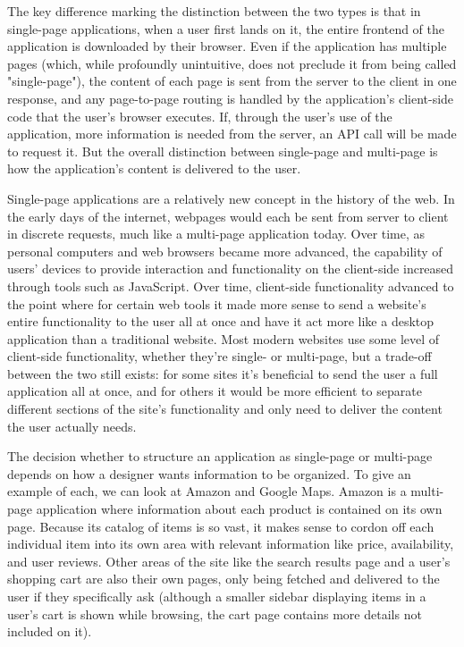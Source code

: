 The key difference marking the distinction between the two types is that in single-page applications, when a user first lands on it, the entire frontend of the application is downloaded by their browser. Even if the application has multiple pages (which, while profoundly unintuitive, does not preclude it from being called "single-page"), the content of each page is sent from the server to the client in one response, and any page-to-page routing is handled by the application's client-side code that the user's browser executes. If, through the user's use of the application, more information is needed from the server, an API call will be made to request it. But the overall distinction between single-page and multi-page is how the application's content is delivered to the user.

Single-page applications are a relatively new concept in the history of the web. In the early days of the internet, webpages would each be sent from server to client in discrete requests, much like a multi-page application today. Over time, as personal computers and web browsers became more advanced, the capability of users' devices to provide interaction and functionality on the client-side increased through tools such as JavaScript. Over time, client-side functionality advanced to the point where for certain web tools it made more sense to send a website's entire functionality to the user all at once and have it act more like a desktop application than a traditional website. Most modern websites use some level of client-side functionality, whether they're single- or multi-page, but a trade-off between the two still exists: for some sites it's beneficial to send the user a full application all at once, and for others it would be more efficient to separate different sections of the site's functionality and only need to deliver the content the user actually needs.

The decision whether to structure an application as single-page or multi-page depends on how a designer wants information to be organized. To give an example of each, we can look at Amazon and Google Maps. Amazon is a multi-page application where information about each product is contained on its own page. Because its catalog of items is so vast, it makes sense to cordon off each individual item into its own area with relevant information like price, availability, and user reviews. Other areas of the site like the search results page and a user's shopping cart are also their own pages, only being fetched and delivered to the user if they specifically ask (although a smaller sidebar displaying items in a user's cart is shown while browsing, the cart page contains more details not included on it).


